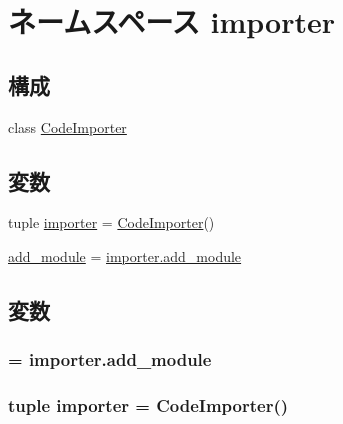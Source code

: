 \hypertarget{namespaceimporter}{
\section{ネームスペース importer}
\label{namespaceimporter}
}
\subsection*{構成}
\begin{DoxyCompactItemize}
\item 
class \hyperlink{classimporter_1_1CodeImporter}{CodeImporter}
\end{DoxyCompactItemize}
\subsection*{変数}
\begin{DoxyCompactItemize}
\item 
tuple \hyperlink{namespaceimporter_af750538b994fec22a1d3a81a42336cde}{importer} = \hyperlink{classimporter_1_1CodeImporter}{CodeImporter}()
\item 
\hyperlink{namespaceimporter_a65b374087483d12df26d21e92e9ac6a9}{add\_\-module} = \hyperlink{namespaceimporter_a65b374087483d12df26d21e92e9ac6a9}{importer.add\_\-module}
\end{DoxyCompactItemize}


\subsection{変数}
\hypertarget{namespaceimporter_a65b374087483d12df26d21e92e9ac6a9}{
\subsubsection[{add\_\-module}]{ = {\bf importer.add\_\-module}}}
\label{namespaceimporter_a65b374087483d12df26d21e92e9ac6a9}
\hypertarget{namespaceimporter_af750538b994fec22a1d3a81a42336cde}{
\subsubsection[{importer}]{\setlength{\rightskip}{0pt plus 5cm}tuple {\bf importer} = {\bf CodeImporter}()}}
\label{namespaceimporter_af750538b994fec22a1d3a81a42336cde}
